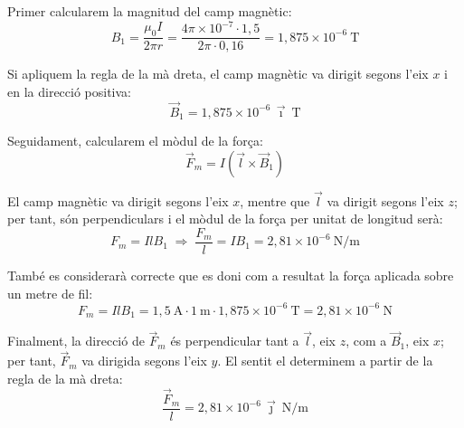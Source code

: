 \begin{solapartat}
 Primer calcularem la magnitud del camp magnètic:
\[ B_1 = \frac{\mu_0 I}{2\pi r} = \frac{4\pi\times 10^{-7}\cdot 1,5}{2\pi\cdot 0,16} = 1,875\times 10^{-6}\ \mathrm{T} \]

 Si apliquem la regla de la mà dreta, el camp magnètic va dirigit segons l'eix $x$ i en la direcció positiva:
\[ \vec{B}_1 = 1,875\times 10^{-6}\,\vec{\imath}\ \mathrm{T} \]

Seguidament, calcularem el mòdul de la força:
\[ \vec{F}_m = I(\vec{l}\times \vec{B}_1) \]

 El camp magnètic va dirigit segons l'eix $x$, mentre que $\vec{l}$ va dirigit segons l'eix $z$; per tant, són perpendiculars i el mòdul de la força per unitat de longitud serà:
\[ F_m = I l B_1 \;\Rightarrow\; \frac{F_m}{l} = I B_1 = 2,81\times 10^{-6}\ \mathrm{N/m} \]

També es considerarà correcte que es doni com a resultat la força aplicada sobre un metre de fil:
\[ F_m = I l B_1 = 1,5\ \mathrm{A}\cdot 1\ \mathrm{m}\cdot 1,875\times 10^{-6}\ \mathrm{T} = 2,81\times 10^{-6}\ \mathrm{N} \]

 Finalment, la direcció de $\vec{F}_m$ és perpendicular tant a $\vec{l}$, eix $z$, com a $\vec{B}_1$, eix $x$; per tant, $\vec{F}_m$ va dirigida segons l'eix $y$. El sentit el determinem a partir de la regla de la mà dreta:
\[ \frac{\vec{F}_m}{l} = 2,81\times 10^{-6}\,\vec{\jmath}\ \mathrm{N/m} \]

\end{solapartat}
